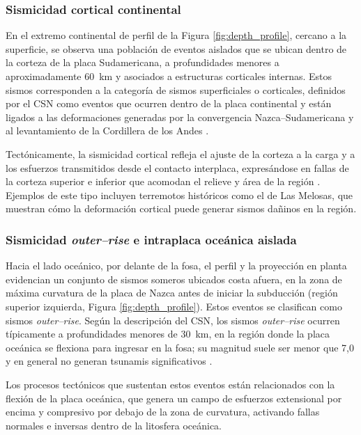 \documentclass[a4paper,12pt]{article} %
\numberwithin{equation}{section} %
\numberwithin{figure}{section} %
\begin{document}
\subsubsection{Sismicidad cortical continental}

En el extremo continental de perfil de la Figura \ref{fig:depth_profile}, cercano a la superficie, se observa una población de eventos aislados que se ubican dentro de la corteza de la placa Sudamericana, a profundidades menores a aproximadamente 60~km y asociados a estructuras corticales internas. Estos sismos corresponden a la categoría de sismos superficiales o corticales, definidos por el CSN como eventos que ocurren dentro de la placa continental y están ligados a las deformaciones generadas por la convergencia Nazca--Sudamericana y al levantamiento de la Cordillera de los Andes \cite{csn_tipos_sismos}.

Tectónicamente, la sismicidad cortical refleja el ajuste de la corteza a la carga y a los esfuerzos transmitidos desde el contacto interplaca, expresándose en fallas de la corteza superior e inferior que acomodan el relieve y área de la región \cite{csn_tipos_sismos,fernandez_2018}. Ejemplos de este tipo incluyen terremotos históricos como el de Las Melosas, que muestran cómo la deformación cortical puede generar sismos dañinos en la región.

\subsubsection{Sismicidad \emph{outer--rise} e intraplaca oceánica aislada}

Hacia el lado oceánico, por delante de la fosa, el perfil y la proyección en planta evidencian un conjunto de sismos someros ubicados costa afuera, en la zona de máxima curvatura de la placa de Nazca antes de iniciar la subducción (región superior izquierda, Figura \ref{fig:depth_profile}). Estos eventos se clasifican como sismos \emph{outer--rise}. Según la descripción del CSN, los sismos \emph{outer--rise} ocurren típicamente a profundidades menores de 30~km, en la región donde la placa oceánica se flexiona para ingresar en la fosa; su magnitud suele ser menor que 7{,}0 y en general no generan tsunamis significativos \cite{csn_tipos_sismos}.

Los procesos tectónicos que sustentan estos eventos están relacionados con la flexión de la placa oceánica, que genera un campo de esfuerzos extensional por encima y compresivo por debajo de la zona de curvatura, activando fallas normales e inversas dentro de la litosfera oceánica.
\end{document}
